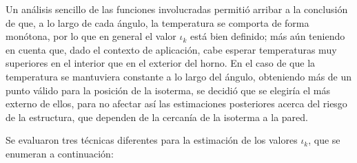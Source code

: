             Un análisis sencillo de las funciones involucradas permitió arribar a la conclusión de que, a lo largo de cada ángulo, la temperatura se comporta de forma monótona, por lo que en general el valor $\iota_k$ está bien definido; más aún teniendo en cuenta que, dado el contexto de aplicación, cabe esperar temperaturas muy superiores en el interior que en el exterior del horno. En el caso de que la temperatura se mantuviera constante a lo largo del ángulo, obteniendo más de un punto válido para la posición de la isoterma, se decidió que se elegiría el más externo de ellos, para no afectar así las estimaciones posteriores acerca del riesgo de la estructura, que dependen de la cercanía de la isoterma a la pared.

            Se evaluaron tres técnicas diferentes para la estimación de los valores $\iota_k$, que se enumeran a continuación:

